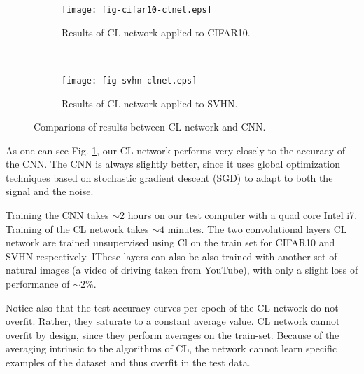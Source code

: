 \documentclass{article} %
\begin{document}
\begin{figure}
        \centering
        \begin{subfigure}[b]{0.5\textwidth}
                \centering
                \texttt{[image: fig-cifar10-clnet.eps]}
                \caption{Results of CL network applied to CIFAR10.}
        \end{subfigure}%
        ~%
        \begin{subfigure}[b]{0.5\textwidth}
                \centering
                \texttt{[image: fig-svhn-clnet.eps]}
                \caption{Results of CL network applied to SVHN.}
        \end{subfigure}
        \caption{Comparions of results between CL network and CNN.}
        \label{fig-results1}
\end{figure}


As one can see Fig. \ref{fig-results1}, our CL network performs very closely to the accuracy of the CNN. The CNN is always slightly better, since it uses global optimization techniques based on stochastic gradient descent (SGD) to adapt to both the signal and the noise. 

Training the CNN takes $\sim 2$ hours on our test computer with a quad core Intel i7. Training of the CL network takes $\sim 4$ minutes.
The two convolutional layers CL network are trained unsupervised using Cl on the train set for CIFAR10 and SVHN respectively. IThese layers can also be also trained with another set of natural images (a video of driving taken from YouTube), with only a slight loss of performance of $\sim 2\%$. 

Notice also that the test accuracy curves per epoch of the CL network do not overfit. Rather, they saturate to a constant average value. CL network cannot overfit by design, since they perform averages on the train-set. Because of the averaging intrinsic to the algorithms of CL, the network cannot learn specific examples of the dataset and thus overfit in the test data.
\end{document}
